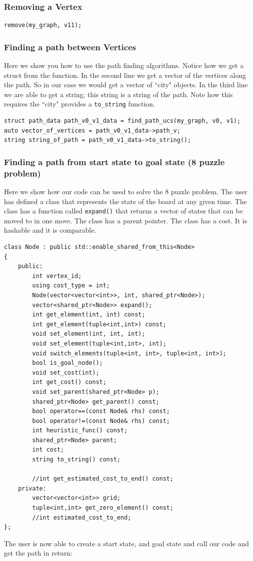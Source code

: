 \documentclass{article}
\begin{document}
\subsubsection{Removing a Vertex}
\begin{lstlisting}
remove(my_graph, v11);
\end{lstlisting}

\subsubsection{Finding a path between Vertices}
Here we show you how to use the path finding algorithms. Notice how we get a struct from the function. In the second line we get a vector of the vertices along the path. So in our case we would get a vector of ``city" objects. In the third line we are able to get a string; this string is a string of the path. Note how this requires the ``city" provides a \texttt{to\_string} function.
\begin{lstlisting}
struct path_data path_v0_v1_data = find_path_ucs(my_graph, v0, v1);
auto vector_of_vertices = path_v0_v1_data->path_v;
string string_of_path = path_v0_v1_data->to_string();
\end{lstlisting}

\subsubsection{Finding a path from start state to goal state (8 puzzle problem)}
Here we show how our code can be used to solve the 8 puzzle problem. The user has defined a class that represents the state of the board at any given time. The class has a function called \texttt{expand()} that returns a vector of states that can be moved to in one move. The class has a parent pointer. The class has a cost. It is hashable and it is comparable. 

\begin{lstlisting}
class Node : public std::enable_shared_from_this<Node>
{
	public:
		int vertex_id;
		using cost_type = int;
		Node(vector<vector<int>>, int, shared_ptr<Node>);
		vector<shared_ptr<Node>> expand();
		int get_element(int, int) const;
		int get_element(tuple<int,int>) const;
		void set_element(int, int, int);
		void set_element(tuple<int,int>, int);
		void switch_elements(tuple<int, int>, tuple<int, int>);
		bool is_goal_node();
		void set_cost(int);
		int get_cost() const;
		void set_parent(shared_ptr<Node> p);
		shared_ptr<Node> get_parent() const;
		bool operator==(const Node& rhs) const;
		bool operator!=(const Node& rhs) const;
		int heuristic_func() const;
		shared_ptr<Node> parent;
		int cost;
		string to_string() const;

		//int get_estimated_cost_to_end() const;
	private:
		vector<vector<int>> grid;
		tuple<int,int> get_zero_element() const;
		//int estimated_cost_to_end;
};

\end{lstlisting}
The user is now able to create a start state, and goal state and call our code and get the path in return:
\end{document}
